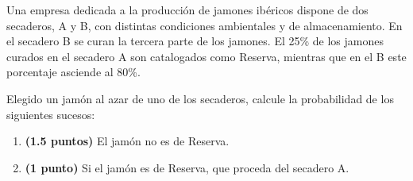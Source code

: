 
Una empresa dedicada a la producción de jamones ibéricos dispone de dos secaderos, A y B, con distintas condiciones ambientales y de almacenamiento. En el secadero B se curan la tercera parte de los jamones. El 25\% de los jamones curados en el secadero A son catalogados como Reserva, mientras que en el B este porcentaje asciende al 80\%.

Elegido un jamón al azar de uno de los secaderos, calcule la probabilidad de los siguientes sucesos:
\begin{enumerate}[label=\alph*)]
\item \textbf{(1.5 puntos)} El jamón no es de Reserva.
\item \textbf{(1 punto)} Si el jamón es de Reserva, que proceda del secadero A.
\end{enumerate}

